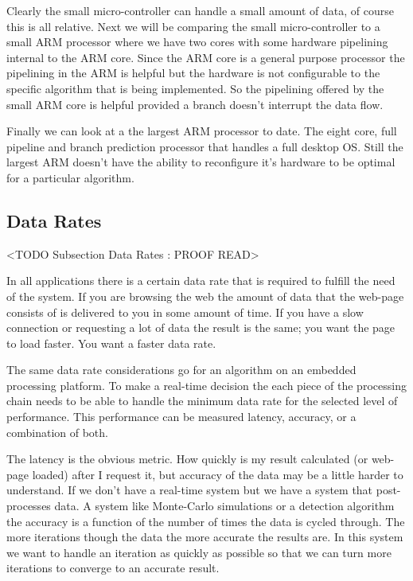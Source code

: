 Clearly the small micro-controller can handle a small amount of data, of course this is all relative. Next we will be comparing the small micro-controller to a small \ac{ARM} processor where we have two cores with some hardware pipelining internal to the \ac{ARM} core. Since the \ac{ARM} core is a general purpose processor the pipelining in the \ac{ARM} is helpful but the hardware is not configurable to the specific algorithm that is being implemented. So the pipelining offered by the small \ac{ARM} core is helpful provided a branch doesn't interrupt the data flow. 

Finally we can look at a the largest \ac{ARM} processor to date. The eight core, full pipeline and branch prediction processor that handles a full desktop \ac{OS}. Still the largest \ac{ARM} doesn't have the ability to reconfigure it's hardware to be optimal for a particular algorithm.

\subsection{Data Rates}
	<TODO Subsection Data Rates : PROOF READ>
	
In all applications there is a certain data rate that is required to fulfill the need of the system. If you are browsing the web the amount of data that the web-page consists of is delivered to you in some amount of time. If you have a slow connection or requesting a lot of data the result is the same; you want the page to load faster. You want a faster data rate.

The same data rate considerations go for an algorithm on an embedded processing platform. To make a real-time decision the each piece of the processing chain needs to be able to handle the minimum data rate for the selected level of performance. This performance can be measured latency, accuracy, or a combination of both. 

The latency is the obvious metric. How quickly is my result calculated (or web-page loaded) after I request it, but accuracy of the data may be a little harder to understand. If we don't have a real-time system but we have a system that post-processes data. A system like Monte-Carlo simulations or a detection algorithm the accuracy is a function of the number of times the data is cycled through. The more iterations though the data the more accurate the results are. In this system we want to handle an iteration as quickly as possible so that we can turn more iterations to converge to an accurate result. 
	
